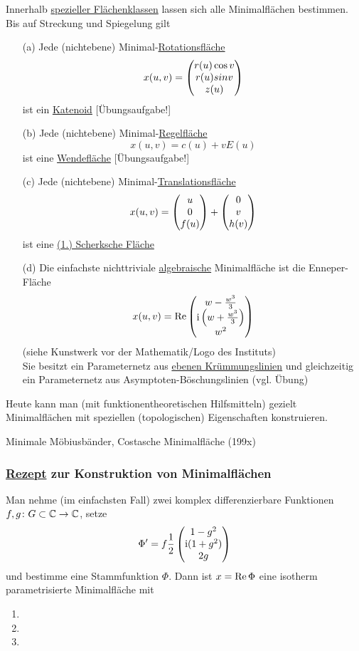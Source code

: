 Innerhalb \uline{spezieller Flächenklassen} lassen sich alle Minimalflächen bestimmen. Bis auf Streckung und Spiegelung gilt
\begin{enumerate}
 \item[(a)] Jede (nichtebene) Minimal-\uline{Rotationsfläche}
 \[
  x(u,v) = \begin{pmatrix} r(u) \cos v \\ r(u) sin v \\ z(u) \end{pmatrix} 
 \]
 ist ein \uline{Katenoid} [Übungsaufgabe!]
 \item[(b)] Jede (nichtebene) Minimal-\uline{Regelfläche}
 \[
  x(u,v) = c(u) + v E(u)
 \]
 ist eine \uline{Wendefläche} [Übungsaufgabe!]
 \item[(c)] Jede (nichtebene) Minimal-\uline{Translationsfläche}
 \[
  x(u,v) = \begin{pmatrix} u \\ 0 \\ f(u) \end{pmatrix}  + \begin{pmatrix} 0 \\ v \\ h(v) \end{pmatrix} 
 \]
 ist eine \uline{(1.) Scherksche Fläche} 
 \item[(d)] Die einfachste nichttriviale \uline{algebraische} Minimalfläche ist die Enneper-Fläche
 \[
  x(u,v) = \operatorname{Re} \begin{pmatrix} w - \frac{w^3}{3} \\ \operatorname{i} \left(w + \frac{w^3}{3}\right) \\ w^2 \end{pmatrix} 
 \]
 (siehe Kunstwerk vor der Mathematik/Logo des Instituts) \\
 Sie besitzt ein Parameternetz aus \uline{ebenen Krümmungslinien} und gleichzeitig ein Parameternetz aus Asymptoten-Böschungslinien (vgl. Übung)
\end{enumerate}

Heute kann man (mit funktionentheoretischen Hilfsmitteln) gezielt Minimalflächen mit speziellen (topologischen) Eigenschaften konstruieren.

\begin{bsp}
 Minimale Möbiusbänder, Costasche Minimalfläche (199x)
\end{bsp}

\subsubsection{\uline{Rezept} zur Konstruktion von Minimalflächen}
Man nehme (im einfachsten Fall) zwei komplex differenzierbare Funktionen \(f,g \colon G \subset \mathbb{C} \to \mathbb{C}\), setze
\[
 \Phi' = f \frac{1}{2} \begin{pmatrix} 1-g^2 \\ \operatorname{i}(1 + g^2) \\ 2 g \end{pmatrix} 
\]
und bestimme eine Stammfunktion \(\Phi\). Dann ist \(x = \operatorname{Re} \Phi\) eine isotherm parametrisierte Minimalfläche mit
\begin{enumerate}
 \item {}
 \item {}
 \item {}
\end{enumerate}

